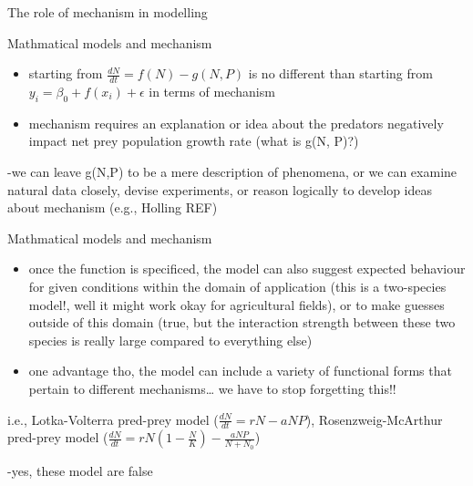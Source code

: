 \documentclass[
  ignorenonframetext,
]{beamer}
\begin{document}
\begin{frame}{The role of mechanism in modelling}
\begin{block}{Mathmatical models and mechanism}
\protect\hypertarget{mathmatical-models-and-mechanism}{}
\begin{itemize}
\item
  starting from \(\frac{dN}{dt}=f(N)-g(N,P)\) is no different than
  starting from \(y_i=\beta_0 + f(x_i)+\epsilon\) in terms of mechanism
\item
  mechanism requires an explanation or idea about the predators
  negatively impact net prey population growth rate (what is g(N, P)?)
\end{itemize}

-we can leave g(N,P) to be a mere description of phenomena, or we can
examine natural data closely, devise experiments, or reason logically to
develop ideas about mechanism (e.g., Holling REF)
\end{block}

\begin{block}{Mathmatical models and mechanism}
\protect\hypertarget{mathmatical-models-and-mechanism-1}{}
\begin{itemize}
\item
  once the function is specificed, the model can also suggest expected
  behaviour for given conditions within the domain of application (this
  is a two-species model!, well it might work okay for agricultural
  fields), or to make guesses outside of this domain (true, but the
  interaction strength between these two species is really large
  compared to everything else)
\item
  one advantage tho, the model can include a variety of functional forms
  that pertain to different mechanisms\ldots{} we have to stop
  forgetting this!!
\end{itemize}

i.e., Lotka-Volterra pred-prey model (\(\frac{dN}{dt}=rN-aNP\)),
Rosenzweig-McArthur pred-prey model
(\(\frac{dN}{dt}=rN(1-\frac{N}{K})-\frac{aNP}{N+N_0}\))

-yes, these model are false
\end{block}


\end{frame}
\end{document}
